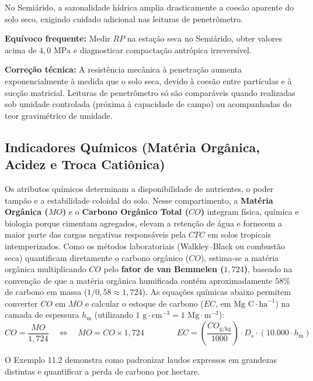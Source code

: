 No Semiárido, a sazonalidade hídrica amplia drasticamente a coesão aparente do solo seco, exigindo cuidado adicional nas leituras de penetrômetro.

\begin{boxErro}
\textbf{Equívoco frequente:} Medir $RP$ na estação seca no Semiárido, obter valores acima de $4{,}0\text{ MPa}$ e diagnosticar compactação antrópica irreversível.\par
\textbf{Correção técnica:} A resistência mecânica à penetração aumenta exponencialmente à medida que o solo seca, devido à coesão entre partículas e à sucção matricial. Leituras de penetrômetro só são comparáveis quando realizadas sob umidade controlada (próxima à capacidade de campo) ou acompanhadas do teor gravimétrico de umidade.
\end{boxErro}

\subsection{Indicadores Químicos (Matéria Orgânica, Acidez e Troca Catiônica)}

Os atributos químicos determinam a disponibilidade de nutrientes, o poder tampão e a estabilidade coloidal do solo. Nesse compartimento, a \textbf{Matéria Orgânica ($MO$)} e o \textbf{Carbono Orgânico Total ($CO$)} integram física, química e biologia porque cimentam agregados, elevam a retenção de água e fornecem a maior parte das cargas negativas responsáveis pela $CTC$ em solos tropicais intemperizados. Como os métodos laboratoriais (Walkley--Black ou combustão seca) quantificam diretamente o carbono orgânico ($CO$), estima-se a matéria orgânica multiplicando $CO$ pelo \textbf{fator de van Bemmelen ($1{,}724$)}, baseado na convenção de que a matéria orgânica humificada contém aproximadamente $58\%$ de carbono em massa ($1 / 0{,}58 \approx 1{,}724$). As equações químicas abaixo permitem converter $CO$ em $MO$ e calcular o estoque de carbono ($EC$, em $\text{Mg C}\cdot\text{ha}^{-1}$) na camada de espessura $h_{\text{m}}$ (utilizando $1\text{ g}\cdot\text{cm}^{-3} = 1\text{ Mg}\cdot\text{m}^{-3}$):
\[
CO = \frac{MO}{1{,}724} \quad \Longleftrightarrow \quad MO = CO \times 1{,}724 \qquad\qquad EC = \left(\frac{CO_{\text{g/kg}}}{1000}\right) \cdot D_s \cdot (10.000 \cdot h_{\text{m}})
\]

O Exemplo 11.2 demonstra como padronizar laudos expressos em grandezas distintas e quantificar a perda de carbono por hectare.

